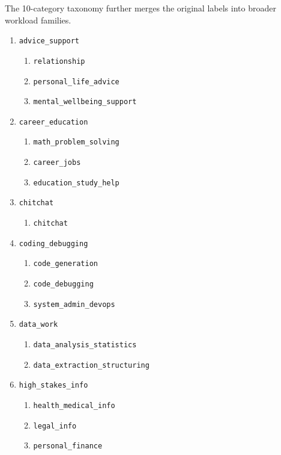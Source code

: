 \documentclass{article}
\begin{document}
The 10-category taxonomy further merges the original labels into broader workload families.

\begin{enumerate}
    \item \texttt{advice\_support}
    \begin{enumerate}
        \item \texttt{relationship}
        \item \texttt{personal\_life\_advice}
        \item \texttt{mental\_wellbeing\_support}
    \end{enumerate}

    \item \texttt{career\_education}
    \begin{enumerate}
        \item \texttt{math\_problem\_solving}
        \item \texttt{career\_jobs}
        \item \texttt{education\_study\_help}
    \end{enumerate}

    \item \texttt{chitchat}
    \begin{enumerate}
        \item \texttt{chitchat}
    \end{enumerate}

    \item \texttt{coding\_debugging}
    \begin{enumerate}
        \item \texttt{code\_generation}
        \item \texttt{code\_debugging}
        \item \texttt{system\_admin\_devops}
    \end{enumerate}

    \item \texttt{data\_work}
    \begin{enumerate}
        \item \texttt{data\_analysis\_statistics}
        \item \texttt{data\_extraction\_structuring}
    \end{enumerate}

    \item \texttt{high\_stakes\_info}
    \begin{enumerate}
        \item \texttt{health\_medical\_info}
        \item \texttt{legal\_info}
        \item \texttt{personal\_finance}
    \end{enumerate}


\end{enumerate}
\end{document}
